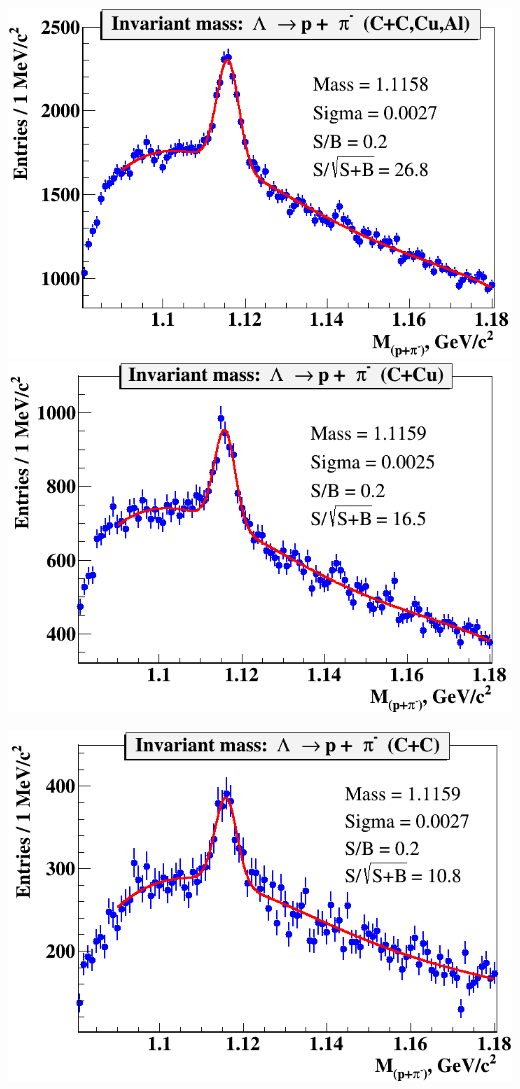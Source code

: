 \documentclass[dvipsnames] {beamer}
\begin{document}
\begin{frame}
\begin{columns}[t]
\begin{block}{\bf {}}
\begin{minipage}{.49\linewidth}
        \includegraphics[width=1.\linewidth]{lambda_all.png}
        \includegraphics[width=1.\linewidth]{lambda_Cu.png}
      \end{minipage}
      \begin{minipage}{.49\linewidth}
        \includegraphics[width=1.\linewidth]{lambda_C.png}

\end{minipage}
\end{block}
\end{columns}
\end{frame}
\end{document}
